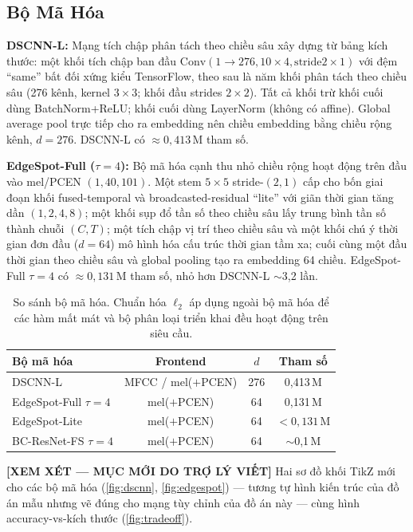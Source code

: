 \documentclass[12pt,a4paper]{report}
\newcommand{\reviewnote}[1]{%
  \par\smallskip\noindent
  \colorbox{yellow!35}{\parbox{0.97\linewidth}{\small\textbf{[XEM XÉT — MỤC MỚI DO TRỢ LÝ VIẾT]}\; #1}}%
  \par\smallskip}
\begin{document}
\subsection{Bộ Mã Hóa}\label{sec:encoders}

\textbf{DSCNN-L:} Mạng tích chập phân tách theo chiều sâu xây dựng từ bảng kích
thước: một khối tích chập ban đầu $\text{Conv}(1{\to}276, 10{\times}4, \text{stride
}2{\times}1)$ với đệm ``same'' bất đối xứng kiểu TensorFlow, theo sau là năm khối
phân tách theo chiều sâu (276 kênh, kernel $3{\times}3$; khối đầu strides
$2{\times}2$). Tất cả khối trừ khối cuối dùng BatchNorm+ReLU; khối cuối dùng
LayerNorm (không có affine). Global average pool trực tiếp cho ra embedding nên
chiều embedding bằng chiều rộng kênh, $d = 276$. DSCNN-L có $\approx 0{,}413$\,M
tham số.

\textbf{EdgeSpot-Full ($\tau{=}4$):} Bộ mã hóa cạnh thu nhỏ chiều rộng hoạt động
trên đầu vào mel/PCEN $(1,40,101)$. Một stem $5{\times}5$ stride-$(2,1)$ cấp cho
bốn giai đoạn khối fused-temporal và broadcasted-residual ``lite'' với giãn thời
gian tăng dần $(1,2,4,8)$; một khối sụp đổ tần số theo chiều sâu lấy trung bình
tần số thành chuỗi $(C,T)$; một tích chập vị trí theo chiều sâu và một khối chú ý
thời gian đơn đầu ($d = 64$) mô hình hóa cấu trúc thời gian tầm xa; cuối cùng
một đầu thời gian theo chiều sâu và global pooling tạo ra embedding 64 chiều.
EdgeSpot-Full $\tau{=}4$ có $\approx 0{,}131$\,M tham số, nhỏ hơn DSCNN-L
$\sim$3{,}2 lần.

\begin{table}[t]
\centering
\caption{So sánh bộ mã hóa. Chuẩn hóa $\ell_2$ áp dụng ngoài bộ mã hóa để các
hàm mất mát và bộ phân loại triển khai đều hoạt động trên siêu cầu.}
\label{tab:encoders}
\begin{tabular}{lccc}
\toprule
\textbf{Bộ mã hóa} & \textbf{Frontend} & \textbf{$d$} & \textbf{Tham số} \\
\midrule
DSCNN-L              & MFCC / mel($+$PCEN) & 276 & 0{,}413\,M \\
EdgeSpot-Full $\tau{=}4$ & mel($+$PCEN)    & 64  & 0{,}131\,M \\
EdgeSpot-Lite       & mel($+$PCEN)        & 64  & $<0{,}131$\,M \\
BC-ResNet-FS $\tau{=}4$  & mel($+$PCEN)    & 64  & $\sim$0{,}1\,M \\
\bottomrule
\end{tabular}
\end{table}

\reviewnote{Hai sơ đồ khối TikZ mới cho các bộ mã hóa (\ref{fig:dscnn},
\ref{fig:edgespot}) --- tương tự hình kiến trúc của đồ án mẫu nhưng vẽ đúng cho
mạng tùy chỉnh của đồ án này --- cùng hình accuracy-vs-kích thước (\ref{fig:tradeoff}).}
\end{document}
